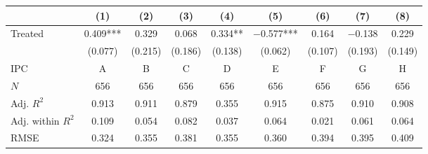 
\begin{tabular}[t]{lcccccccc}
\toprule
  & (1) & (2) & (3) & (4) & (5) & (6) & (7) & (8)\\
\midrule
Treated & \num{0.409}*** & \num{0.329} & \num{0.068} & \num{0.334}** & \num{-0.577}*** & \num{0.164} & \num{-0.138} & \num{0.229}\\
 & (\num{0.077}) & (\num{0.215}) & (\num{0.186}) & (\num{0.138}) & (\num{0.062}) & (\num{0.107}) & (\num{0.193}) & (\num{0.149})\\
\midrule
IPC & A & B & C & D & E & F & G & H\\
$N$ & \num{656} & \num{656} & \num{656} & \num{656} & \num{656} & \num{656} & \num{656} & \num{656}\\
Adj. $R^2$ & \num{0.913} & \num{0.911} & \num{0.879} & \num{0.355} & \num{0.915} & \num{0.875} & \num{0.910} & \num{0.908}\\
Adj. within $R^2$ & \num{0.109} & \num{0.054} & \num{0.082} & \num{0.037} & \num{0.064} & \num{0.021} & \num{0.061} & \num{0.064}\\
RMSE & \num{0.324} & \num{0.355} & \num{0.381} & \num{0.355} & \num{0.360} & \num{0.394} & \num{0.395} & \num{0.409}\\
\bottomrule
\end{tabular}
